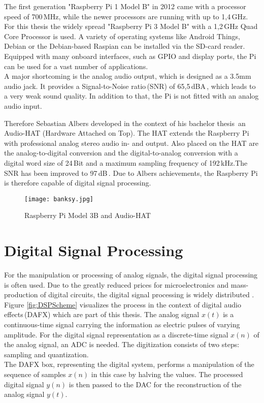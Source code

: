 The first generation "Raspberry Pi 1 Model B" in 2012 came with a processor
speed of 700\,MHz, while the newer processors are running with up to 1,4\,GHz.
For this thesis the widely spread "Raspberry Pi 3 Model B" with a 1,2\,GHz Quad Core Processor is used.
A variety of operating systems like Android Things, Debian or the Debian-based Raspian can be installed 
via the SD-card reader.
Equipped with many onboard interfaces, such as GPIO and display ports, the Pi can be used for a vast number of applications.
\\
A major shortcoming is the analog audio output, which is designed as a 3.5mm audio jack.
It provides a Signal-to-Noise ratio\,(SNR) of 65,5\,dBA\,\cite[pp.\,72-74]{Strom:2015}, which leads to a very weak sound quality.
In addition to that, the Pi is not fitted with an analog audio input.

Therefore Sebastian Albers developed in the context of his bachelor thesis\,\cite{Albers:2017} an Audio-HAT
(Hardware Attached on Top). The HAT extends the Raspberry Pi with professional analog stereo audio in- and output. Also placed on the HAT are the analog-to-digital conversion and the digital-to-analog conversion with a digital word size of 24\,Bit and a maximum sampling frequency of 192\,kHz.The SNR has been improved to 97\,dB\,\cite[p.\,94]{Albers:2017}.
Due to Albers achievements, the Raspberry Pi is therefore capable of digital signal processing.

\begin{figure}[H]
	\centering \texttt{[image: banksy.jpg]}
	\caption[PiandHAT]{Raspberry Pi Model 3B and Audio-HAT \cite[p.\,65]{Albers:2017}}
	\label{fig:PiandHAT}
\end{figure}



\section{Digital Signal Processing}

For the manipulation or processing of analog signals, the digital signal processing is often used. Due to the greatly reduced prices for microelectronics and mass-production of digital circuits, the 
digital signal processing is widely distributed \cite[p.\,101]{Werner:2010}.\\
Figure \ref{fig:DSPScheme} visualizes the process in the context of digital audio effects\,(DAFX) which are part of this thesis. The analog signal $x(t)$ is a continuous-time signal carrying the information as electric pulses of varying amplitude. For the digital signal representation as a discrete-time signal $x(n)$ of the analog signal, an ADC is needed.
The digitization consists of two steps: sampling and quantization.\\
The DAFX box, representing the digital system, performs a manipulation of the sequence of samples $x(n)$ in this case by halving the values. The processed digital signal $y(n)$ is then passed to the DAC for the reconstruction of the analog signal $y(t)$.

